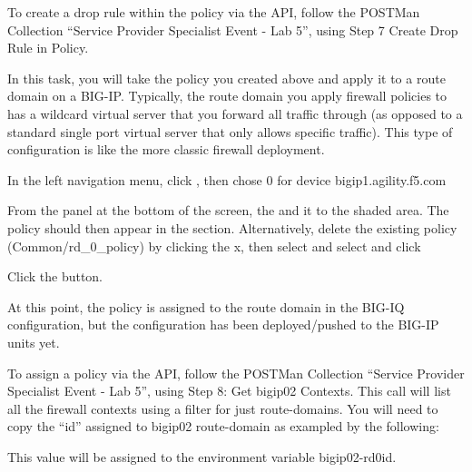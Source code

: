 \documentclass[letterpaper,10pt,english]{sphinxmanual}
\begin{document}
To create a drop rule within the policy via the API, follow the
POSTMan Collection “Service Provider Specialist Event - Lab 5”,
using Step 7 \textendash{} Create Drop Rule in Policy.

In this task, you will take the policy you created above and apply
it to a route domain on a BIG-IP. Typically, the route domain you
apply firewall policies to has a wildcard virtual server that you
forward all traffic through (as opposed to a standard single port
virtual server that only allows specific traffic). This type of
configuration is like the more classic firewall deployment.

In the left navigation menu, click , then chose 0 for device
bigip1.agility.f5.com


From the  panel at the bottom of the screen, 
the  and  it to the  shaded area. The policy should then appear in the  section. Alternatively, delete the existing policy
(Common/rd\_0\_policy) by clicking the x, then select  and select  and click 


Click the  button.

At this point, the policy is assigned to the route domain in the BIG-IQ
configuration, but the configuration has  been deployed/pushed to
the BIG-IP units yet.

To assign a policy via the API, follow the POSTMan Collection “Service
Provider Specialist Event - Lab 5”, using Step 8: Get bigip02 Contexts.
This call will list all the firewall contexts using a filter for just
route-domains. You will need to copy the “id” assigned to bigip02
route-domain as exampled by the following:


This value will be assigned to the environment variable bigip02-rd0id.
\end{document}
